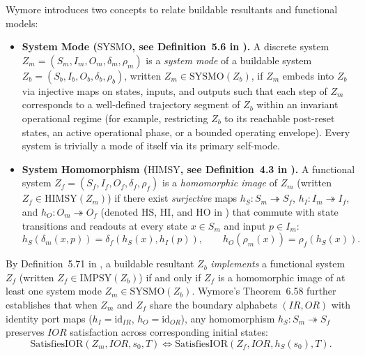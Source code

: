 Wymore introduces two concepts to relate buildable resultants and functional models:
\begin{itemize}
    \item \textbf{System Mode ($\mathrm{SYSMO}$, see Definition~5.6 in \citet{Wymore1993}).} A discrete system $Z_m=(S_m,I_m,O_m,\delta_m,\rho_m)$ is a \emph{system mode} of a buildable system $Z_b=(S_b,I_b,O_b,\delta_b,\rho_b)$, written $Z_m\in\mathrm{SYSMO}(Z_b)$, if $Z_m$ embeds into $Z_b$ via injective maps on states, inputs, and outputs such that each step of $Z_m$ corresponds to a well-defined trajectory segment of $Z_b$ within an invariant operational regime (for example, restricting $Z_b$ to its reachable post-reset states, an active operational phase, or a bounded operating envelope). Every system is trivially a mode of itself via its primary self-mode.
    \item \textbf{System Homomorphism ($\mathrm{HIMSY}$, see Definition~4.3 in \citet{Wymore1993}).} A functional system $Z_f=(S_f,I_f,O_f,\delta_f,\rho_f)$ is a \emph{homomorphic image} of $Z_m$ (written $Z_f\in\mathrm{HIMSY}(Z_m)$) if there exist \emph{surjective} maps $h_S:S_m\twoheadrightarrow S_f$, $h_I:I_m\twoheadrightarrow I_f$, and $h_O:O_m\twoheadrightarrow O_f$ (denoted $\mathrm{HS}$, $\mathrm{HI}$, and $\mathrm{HO}$ in \citet{Wymore1993}) that commute with state transitions and readouts at every state $x\in S_m$ and input $p\in I_m$:
    \begin{equation}
        h_S(\delta_m(x,p)) = \delta_f(h_S(x),h_I(p)), \qquad h_O(\rho_m(x)) = \rho_f(h_S(x)).
        \label{eq:wymore-hom-def}
    \end{equation}
\end{itemize}
By Definition~5.71 in \citet{Wymore1993}, a buildable resultant $Z_b$ \emph{implements} a functional system $Z_f$ (written $Z_f\in\mathrm{IMPSY}(Z_b)$) if and only if $Z_f$ is a homomorphic image of at least one system mode $Z_m\in\mathrm{SYSMO}(Z_b)$. Wymore's Theorem~6.58 further establishes that when $Z_m$ and $Z_f$ share the boundary alphabets $(IR,OR)$ with identity port maps ($h_I=\mathrm{id}_{IR}$, $h_O=\mathrm{id}_{OR}$), any homomorphism $h_S:S_m\twoheadrightarrow S_f$ preserves $IOR$ satisfaction across corresponding initial states:
\begin{equation}
    \mathrm{SatisfiesIOR}(Z_m,IOR,s_0,T) \Longleftrightarrow \mathrm{SatisfiesIOR}(Z_f,IOR,h_S(s_0),T).
    \label{eq:thm-658-preview}
\end{equation}

